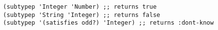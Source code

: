 \begin{lstlisting}[style=reclojureClojure]
(subtypep 'Integer 'Number) ;; returns true
(subtypep 'String 'Integer) ;; returns false
(subtypep '(satisfies odd?) 'Integer) ;; returns :dont-know
\end{lstlisting}
